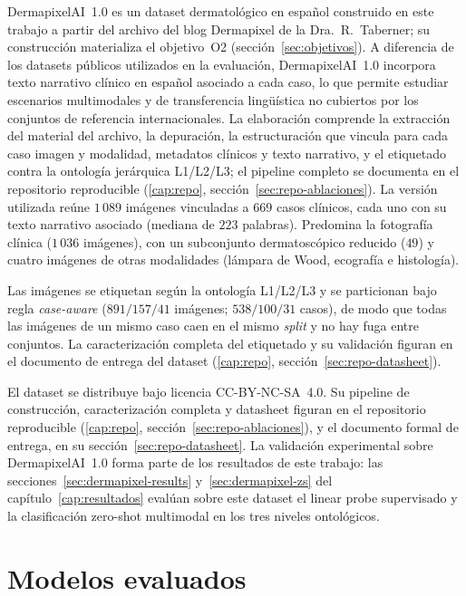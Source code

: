 DermapixelAI~1.0 es un dataset dermatológico en español construido
en este trabajo a partir del archivo del blog Dermapixel de la
Dra.~R.~Taberner; su construcción materializa el objetivo~O2
(sección~\ref{sec:objetivos}). A diferencia de los datasets públicos
utilizados en la evaluación, DermapixelAI~1.0 incorpora texto
narrativo clínico en español asociado a cada caso, lo que permite
estudiar escenarios multimodales y de transferencia lingüística no
cubiertos por los conjuntos de referencia internacionales. La
elaboración comprende la
extracción del material del archivo, la depuración, la
estructuración que vincula para cada caso imagen y modalidad,
metadatos clínicos y texto narrativo, y el etiquetado contra la
ontología jerárquica L1/L2/L3; el pipeline completo se documenta en
el repositorio reproducible (\ref{cap:repo}, sección~\ref{sec:repo-ablaciones}). La versión utilizada reúne $1\,089$
imágenes vinculadas a $669$ casos clínicos, cada uno con su texto
narrativo asociado (mediana de $223$ palabras). Predomina la
fotografía clínica ($1\,036$ imágenes), con un subconjunto
dermatoscópico reducido ($49$) y cuatro imágenes de otras modalidades
(lámpara de Wood, ecografía e histología).

Las imágenes se etiquetan según la ontología L1/L2/L3 y se
particionan bajo regla \emph{case-aware} ($891 / 157 / 41$
imágenes; $538 / 100 / 31$ casos), de modo que todas las imágenes
de un mismo caso caen en el mismo \emph{split} y no hay fuga entre
conjuntos. La caracterización completa del etiquetado y su validación
figuran en el documento de entrega del dataset (\ref{cap:repo},
sección~\ref{sec:repo-datasheet}).

El dataset se distribuye bajo licencia CC-BY-NC-SA~4.0. Su pipeline
de construcción, caracterización completa y datasheet figuran en el
repositorio reproducible (\ref{cap:repo}, sección~\ref{sec:repo-ablaciones}), y el documento formal de entrega, en su
sección~\ref{sec:repo-datasheet}. La validación experimental sobre
DermapixelAI~1.0 forma parte de los resultados de este trabajo: las
secciones~\ref{sec:dermapixel-results} y~\ref{sec:dermapixel-zs} del
capítulo~\ref{cap:resultados} evalúan sobre este dataset el linear probe supervisado y la clasificación zero-shot multimodal en los
tres niveles ontológicos.

\section{Modelos evaluados}
\label{sec:modelos}

